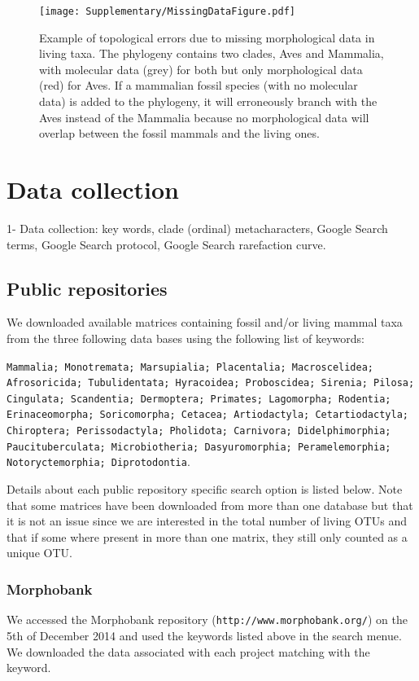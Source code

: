 

\begin{figure}[!htbp]
\centering
    \texttt{[image: Supplementary/MissingDataFigure.pdf]}
\caption{Example of topological errors due to missing morphological data in living taxa.
The phylogeny contains two clades, Aves and Mammalia, with molecular data (grey) for both but only morphological data (red) for Aves.
If a mammalian fossil species (with no molecular data) is added to the phylogeny, it will erroneously branch with the Aves instead of the Mammalia because no morphological data will overlap between the fossil mammals and the living ones.}
\label{Figure_missing_data_problem}
\end{figure}

\bigskip

\section{Data collection}
1- Data collection: key words, clade (ordinal) metacharacters, Google Search terms, Google Search protocol, Google Search rarefaction curve.

\subsection{Public repositories}
We downloaded available matrices containing fossil and/or living mammal taxa from the three following data bases using the following list of keywords:

\texttt{Mammalia; Monotremata; Marsupialia; Placentalia; Macroscelidea; Afrosoricida; Tubulidentata; Hyracoidea; Proboscidea; Sirenia; Pilosa; Cingulata; Scandentia; Dermoptera; Primates; Lagomorpha; Rodentia; Erinaceomorpha; Soricomorpha; Cetacea; Artiodactyla; Cetartiodactyla; Chiroptera; Perissodactyla; Pholidota; Carnivora; Didelphimorphia; Paucituberculata; Microbiotheria; Dasyuromorphia; Peramelemorphia; Notoryctemorphia; Diprotodontia}.

Details about each public repository specific search option is listed below. Note that some matrices have been downloaded from more than one database but that it is not an issue since we are interested in the total number of living OTUs and that if some where present in more than one matrix, they still only counted as a unique OTU.

\subsubsection{Morphobank}
We accessed the Morphobank repository (\texttt{http://www.morphobank.org/}) on the 5th of December 2014 and used the keywords listed above in the search menue. We downloaded the data associated with each project matching with the keyword.

